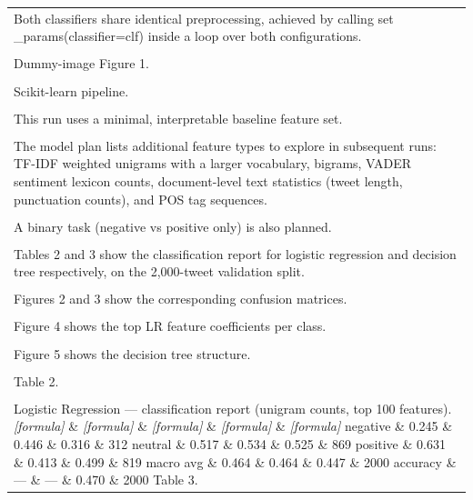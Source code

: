 \documentclass[11pt]{article}
\begin{document}
\begin{longtable}{|p{\dimexpr\linewidth-2\tabcolsep-2\arrayrulewidth\relax}|}
\hline
\rule{0pt}{3.5cm} \\
\hline
Both classifiers share identical preprocessing, achieved by calling set \_params(classifier=clf) inside a loop over both configurations. \\[2pt]
\hline
\rule{0pt}{3.5cm} \\
\hline
Dummy-image Figure 1. \\[2pt]
\hline
\rule{0pt}{3.5cm} \\
\hline
Scikit-learn pipeline. \\[2pt]
\hline
\rule{0pt}{3.5cm} \\
\hline
This run uses a minimal, interpretable baseline feature set. \\[2pt]
\hline
\rule{0pt}{3.5cm} \\
\hline
The model plan lists additional feature types to explore in subsequent runs: TF-IDF weighted unigrams with a larger vocabulary, bigrams, VADER sentiment lexicon counts, document-level text statistics (tweet length, punctuation counts), and POS tag sequences. \\[2pt]
\hline
\rule{0pt}{3.5cm} \\
\hline
A binary task (negative vs positive only) is also planned. \\[2pt]
\hline
\rule{0pt}{3.5cm} \\
\hline
Tables 2 and 3 show the classification report for logistic regression and decision tree respectively, on the 2,000-tweet validation split. \\[2pt]
\hline
\rule{0pt}{3.5cm} \\
\hline
Figures 2 and 3 show the corresponding confusion matrices. \\[2pt]
\hline
\rule{0pt}{3.5cm} \\
\hline
Figure 4 shows the top LR feature coefficients per class. \\[2pt]
\hline
\rule{0pt}{3.5cm} \\
\hline
Figure 5 shows the decision tree structure. \\[2pt]
\hline
\rule{0pt}{3.5cm} \\
\hline
Table 2. \\[2pt]
\hline
\rule{0pt}{3.5cm} \\
\hline
Logistic Regression --- classification report (unigram counts, top 100 features). \textit{[formula]} \& \textit{[formula]} \& \textit{[formula]} \& \textit{[formula]} \& \textit{[formula]} negative \& 0.245 \& 0.446 \& 0.316 \& 312 neutral \& 0.517 \& 0.534 \& 0.525 \& 869 positive \& 0.631 \& 0.413 \& 0.499 \& 819 macro avg \& 0.464 \& 0.464 \& 0.447 \& 2000 accuracy \& --- \& --- \& 0.470 \& 2000 Table 3. \\[2pt]

\end{longtable}
\end{document}
